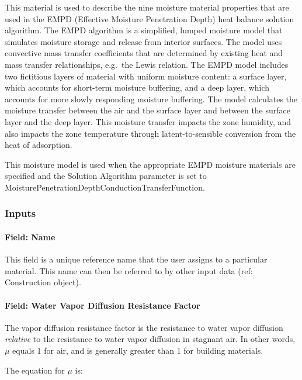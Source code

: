 This material is used to describe the nine moisture material properties that are used in the EMPD (Effective Moisture Penetration Depth) heat balance solution algorithm. The EMPD algorithm is a simplified, lumped moisture model that simulates moisture storage and release from interior surfaces. The model uses convective mass transfer coefficients that are determined by existing heat and mass transfer relationships, e.g.~the Lewis relation. The EMPD model includes two fictitious layers of material with uniform moisture content: a surface layer, which accounts for short-term moisture buffering, and a deep layer, which accounts for more slowly responding moisture buffering. The model calculates the moisture transfer between the air and the surface layer and between the surface layer and the deep layer. This moisture transfer impacts the zone humidity, and also impacts the zone temperature through latent-to-sensible conversion from the heat of adsorption.

This moisture model is used when the appropriate EMPD moisture materials are specified and the Solution Algorithm parameter is set to MoisturePenetrationDepthConductionTransferFunction.

\subsubsection{Inputs}\label{empd-inputs}

\paragraph{Field: Name}\label{materialpropertymoisturepenetrationdepthsettings-field-name}

This field is a unique reference name that the user assigns to a particular material. This name can then be referred to by other input data (ref: Construction object).

\paragraph{Field: Water Vapor Diffusion Resistance Factor}\label{field-water-vapor-diffusion-resistance-factor}

The vapor diffusion resistance factor is the resistance to water vapor diffusion \emph{relative} to the resistance to water vapor diffusion in stagnant air. In other words, \(\mu\) equals 1 for air, and is generally greater than 1 for building materials.

The equation for \(\mu\) is:

